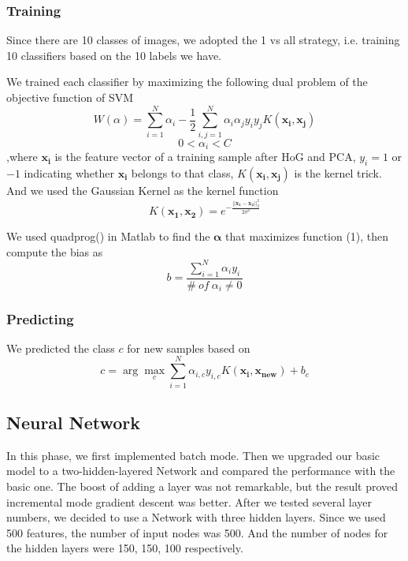 \documentclass{article} %
\begin{document}
\subsubsection{Training}

Since there are 10 classes of images, we adopted the 1 vs all strategy, i.e. training 10 classifiers based on the 10 labels we have.

We trained each classifier by maximizing the following dual problem of the objective function of SVM
\begin{equation}
W(\alpha)=\sum_{i=1}^{N}\alpha_{i}-\frac{1}{2}\sum_{i,j=1}^{N}\alpha_{i}\alpha_{j}y_{i}y_{j}K(\mathbf{x_{i}},\mathbf{x_{j}})
\end{equation}
\begin{equation}
0<\alpha_{i}<C
\end{equation}
,where $\mathbf{x_{i}}$ is the feature vector of a training sample after HoG and PCA, $y_{i}=1$ or $-1$ indicating whether $\mathbf{x_{i}}$ belongs to that class, $K(\mathbf{x_{i}},\mathbf{x_{j}})$ is the kernel trick. And we used the Gaussian Kernel as the kernel function
\begin{equation}
K(\mathbf{x_{1}},\mathbf{x_{2}})=e^{-\frac{||\mathbf{x_{1}}-\mathbf{x_{2}}||^{2}_{2}}{2\sigma^{2}}}
\end{equation}

We used quadprog() in Matlab to find the $\mathbf{\alpha}$ that maximizes function (1), then compute the bias as
\begin{equation}
b=\frac{\sum_{i=1}^{N}\alpha_{i}y_{i}}{\#~of~\alpha_{i}\neq{0}}
\end{equation}

\subsubsection{Predicting}

We predicted the class $c$ for new samples based on
\begin{equation}
c=\arg\max_{c}\sum_{i=1}^{N}\alpha_{i,c}y_{i,c}K(\mathbf{x_{i}},\mathbf{x_{new}})+b_{c}
\end{equation}

\subsection{Neural Network}
In this phase, we first implemented batch mode. Then we upgraded our basic model to a two-hidden-layered Network and compared the performance with the basic one. The boost of adding a layer was not remarkable, but the result proved incremental mode gradient descent was better. After we tested several layer numbers, we decided to use a Network with three hidden layers. Since we used 500 features, the number of input nodes was 500. And the number of nodes for the hidden layers were 150, 150, 100 respectively.
\end{document}
